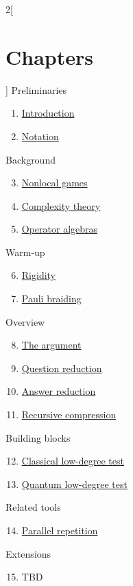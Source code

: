 \begin{multicols}{2}[\section{Chapters}]
\noindent
Preliminaries
\begin{enumerate}
\item \hyperref[introduction-section-phantom]{Introduction}
\item \hyperref[notation-section-phantom]{Notation}
\end{enumerate}
Background
\begin{enumerate}
\setcounter{enumi}{2}
\item \hyperref[nonlocalgames-section-phantom]{Nonlocal games}
\item \hyperref[complexitytheory-section-phantom]{Complexity theory}
\item \hyperref[operatoralgebras-section-phantom]{Operator algebras}
\end{enumerate}
Warm-up
\begin{enumerate}
\setcounter{enumi}{5}
\item \hyperref[rigidity-section-phantom]{Rigidity}
\item \hyperref[paulibraiding-section-phantom]{Pauli braiding}
\end{enumerate}
Overview
\begin{enumerate}
\setcounter{enumi}{7}
\item \hyperref[argument-section-phantom]{The argument}
\item \hyperref[questionreduction-section-phantom]{Question reduction}
\item \hyperref[answerreduction-section-phantom]{Answer reduction}
\item \hyperref[recursivecompression-section-phantom]{Recursive compression}
\end{enumerate}
Building blocks
\begin{enumerate}
\setcounter{enumi}{11}
\item \hyperref[classicalldt-section-phantom]{Classical low-degree test}
\item \hyperref[quantumldt-section-phantom]{Quantum low-degree test}
\end{enumerate}
Related tools
\begin{enumerate}
\setcounter{enumi}{13}
\item \hyperref[parallelrepetition-section-phantom]{Parallel repetition}
\end{enumerate}
Extensions
\begin{enumerate}
\setcounter{enumi}{14}
\item TBD
\end{enumerate}
\end{multicols}